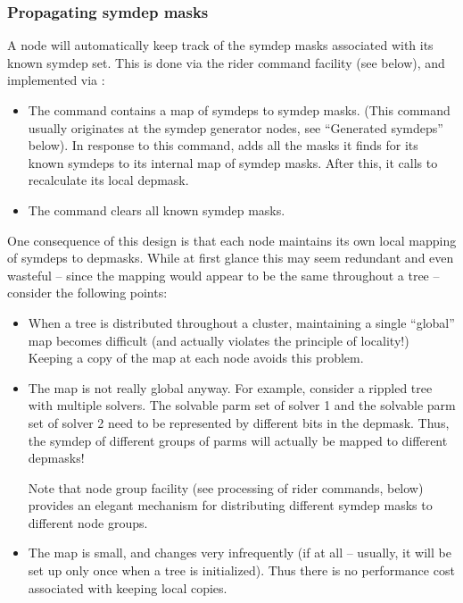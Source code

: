 \documentclass[10pt]{article}
\begin{document}
\subsubsection{Propagating symdep masks}

  A node will automatically keep track of the symdep masks associated with its
  known symdep set. This is done via the rider command facility (see below),
  and implemented via :

  \begin{itemize}
  
  \item The  command contains a map of symdeps to symdep
    masks. (This command usually originates at the symdep generator nodes, see
    ``Generated symdeps'' below). In response to this command,  adds
    all the masks it finds for its known symdeps to its internal map of symdep
    masks. After this, it calls  to recalculate its
    local depmask. 

  \item The  command clears all known symdep masks.
  
  \end{itemize}
  
  One consequence of this design is that each node maintains its own local
  mapping of symdeps to depmasks. While at first glance this may seem redundant
  and even wasteful -- since the mapping would appear to be the same throughout
  a tree -- consider the following points:

  \begin{itemize}
  
  \item When a tree is distributed throughout a cluster, maintaining a single
    ``global'' map becomes difficult (and actually violates the principle of
    locality!) Keeping a copy of the map at each node avoids this problem.

  \item The map is not really global anyway. For example, consider a rippled
    tree with multiple solvers. The solvable parm set of solver 1 and the
    solvable parm set of solver 2 need to be represented by different bits in
    the depmask. Thus, the  symdep of different groups of
    parms will actually be mapped to different depmasks!
    
    Note that node group facility (see processing of rider commands, below)
    provides an elegant mechanism for distributing different symdep masks to
    different node groups.
    
  \item The map is small, and changes very infrequently (if at all -- usually,
    it will be set up only once when a tree is initialized). Thus there is no
    performance cost associated with keeping local copies.

  \end{itemize}
  
\end{document}
